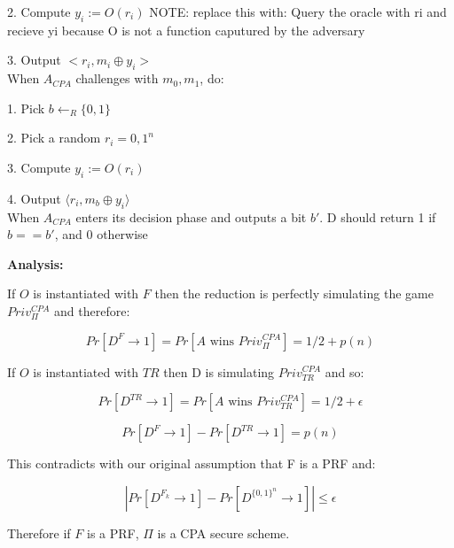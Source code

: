 \documentclass[11pt]{article}
\begin{document}
	\hspace{\parindent} 2. Compute $y_i:=O(r_i)$ NOTE: replace this with:
	Query the oracle with ri and recieve yi
	because O is not a function caputured by the adversary
	
	\hspace{\parindent} 3. Output $<r_i, m_i \oplus y_i>$\\
	
	\hspace{\parindent} When $A_{CPA}$ challenges with $m_0, m_1$, do:
	
	\hspace{\parindent} 1. Pick $b\gets_R \{0,1\}$ 
	
	\hspace{\parindent} 2. Pick a random $r_i = {0,1}^n$
	
	\hspace{\parindent} 3. Compute $y_i:=O(r_i)$
	
	\hspace{\parindent} 4.  Output $\langle r_i, m_b \oplus y_i \rangle$\\
	
	\hspace{\parindent} When $A_{CPA}$ enters its decision phase and outputs a bit $b'$. D should return 1 if $b==b'$, and 0 otherwise


\textbf{Analysis:}

If $O$ is instantiated with $F$ then the reduction is perfectly simulating the game $Priv^{CPA}_\Pi$ and therefore:

$$Pr[D^F \rightarrow 1] = Pr[A \textrm{ wins } Priv^{CPA}_\Pi] = 1/2 + p(n)$$


If $O$ is instantiated with $TR$ then D is simulating $Priv^{CPA}_{TR}$ and so:

$$Pr[D^{TR} \rightarrow 1] = Pr[A \textrm{ wins } Priv^{CPA}_{TR}] = 1/2 + \epsilon$$


$$Pr[D^F \rightarrow 1]-Pr[D^{TR} \rightarrow 1] = p(n)$$

This contradicts with our original assumption that F is a PRF and:

$$|Pr[D^{F_k}\rightarrow 1] - Pr[D^{\{0,1\}^n}\rightarrow1]| \leq \epsilon$$


Therefore if $F$ is a PRF, $\Pi$ is a CPA secure scheme.
\end{document}
